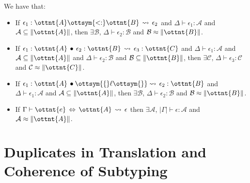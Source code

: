 \begin{theorem}\label{thm:ela-sound}
  We have that:
  \begin{itemize}
  \item If $\epsilon_{{\mathrm{1}}}  :  \ottnt{A}  \ottsym{<:}  \ottnt{B}  \,\rightsquigarrow\,  \epsilon_{{\mathrm{2}}}$ and $\Delta  \vdash  \epsilon_{{\mathrm{1}}}  :  \mathcal{A}$ and $ \mathcal{A}  \subseteq  \|  \ottnt{A}  \| $,
    then $\exists \mathcal{B}$,
    $\Delta  \vdash  \epsilon_{{\mathrm{2}}}  :  \mathcal{B}$ and $\mathcal{B}  \approx  \|  \ottnt{B}  \|$.
  \item If $ \epsilon_{{\mathrm{1}}}   :   \ottnt{A}  \,\bullet\,  \epsilon_{{\mathrm{2}}}   :   \ottnt{B}   \,\rightsquigarrow\,   \epsilon_{{\mathrm{3}}}   :   \ottnt{C} $ and $\Delta  \vdash  \epsilon_{{\mathrm{1}}}  :  \mathcal{A}$ and $ \mathcal{A}  \subseteq  \|  \ottnt{A}  \| $ and
    $\Delta  \vdash  \epsilon_{{\mathrm{2}}}  :  \mathcal{B}$ and $ \mathcal{B}  \subseteq  \|  \ottnt{B}  \| $,
    then  $\exists \mathcal{C}$,
    $\Delta  \vdash  \epsilon_{{\mathrm{3}}}  :  \mathcal{C}$ and $\mathcal{C}  \approx  \|  \ottnt{C}  \|$.
  \item If $ \epsilon_{{\mathrm{1}}}   :   \ottnt{A}  \,\bullet  \ottsym{\{}   \ell   \ottsym{\}}  \! \,\rightsquigarrow\,   \epsilon_{{\mathrm{2}}}   :   \ottnt{B} $ and $\Delta  \vdash  \epsilon_{{\mathrm{1}}}  :  \mathcal{A}$ and $ \mathcal{A}  \subseteq  \|  \ottnt{A}  \| $,
    then  $\exists \mathcal{B}$,
    $\Delta  \vdash  \epsilon_{{\mathrm{2}}}  :  \mathcal{B}$ and $\mathcal{B}  \approx  \|  \ottnt{B}  \|$.
  \item If $\Gamma  \vdash  \ottnt{e} \, \Leftrightarrow \, \ottnt{A}  \,\rightsquigarrow\,  \epsilon$ then $\exists \mathcal{A}$,
    $ | \Gamma |   \vdash  \epsilon  :  \mathcal{A}$ and $\mathcal{A}  \approx  \|  \ottnt{A}  \|$.
  \end{itemize}
\end{theorem}

\section{Duplicates in Translation and Coherence of Subtyping}
\label{sec:duplicates}

